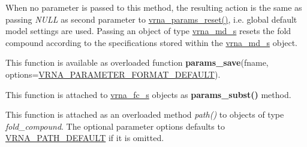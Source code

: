 \begin{DoxyRefList}
When no parameter is passed to this method, the resulting action is the same as passing {\itshape N\+U\+LL} as second parameter to \mbox{\hyperlink{group__energy__parameters_gac40dc82e48a72a97cfc58b9da08a7792}{vrna\+\_\+params\+\_\+reset()}}, i.\+e. global default model settings are used. Passing an object of type \mbox{\hyperlink{group__model__details_structvrna__md__s}{vrna\+\_\+md\+\_\+s}} resets the fold compound according to the specifications stored within the \mbox{\hyperlink{group__model__details_structvrna__md__s}{vrna\+\_\+md\+\_\+s}} object.  
\item[Global \mbox{\hyperlink{group__energy__parameters__rw_ga0de3731b3e4017c52bd678549f6c4ae5}{vrna\+\_\+params\+\_\+save}} (const char fname\mbox{[}\mbox{]}, unsigned int options)]\label{wrappers__wrappers000099}%
%
 This function is available as overloaded function {\bfseries{params\+\_\+save}}(fname, options=\mbox{\hyperlink{group__energy__parameters__rw_ga2d46720ac5bf0e56ce0dbbff459667d2}{V\+R\+N\+A\+\_\+\+P\+A\+R\+A\+M\+E\+T\+E\+R\+\_\+\+F\+O\+R\+M\+A\+T\+\_\+\+D\+E\+F\+A\+U\+LT}}).  
\item[Global \mbox{\hyperlink{group__energy__parameters_ga5d1909208f7ea3baa98b75afaa1f62ca}{vrna\+\_\+params\+\_\+subst}} (vrna\+\_\+fold\+\_\+compound\+\_\+t $\ast$vc, vrna\+\_\+param\+\_\+t $\ast$par)]\label{wrappers__wrappers000094}%
%
 This function is attached to \mbox{\hyperlink{group__fold__compound_structvrna__fc__s}{vrna\+\_\+fc\+\_\+s}} objects as {\bfseries{params\+\_\+subst()}} method.  
\item[Global \mbox{\hyperlink{group__paths__walk_gaef7afadc36933b80706de49fe36e7b94}{vrna\+\_\+path}} (vrna\+\_\+fold\+\_\+compound\+\_\+t $\ast$vc, short $\ast$pt, unsigned int steps, unsigned int options)]\label{wrappers__wrappers000133}%
%
 This function is attached as an overloaded method {\itshape path()} to objects of type {\itshape fold\+\_\+compound}. The optional parameter {\ttfamily options} defaults to \mbox{\hyperlink{group__paths__walk_gaf1bb1f8fec8d24e3b821f621b19f77b4}{V\+R\+N\+A\+\_\+\+P\+A\+T\+H\+\_\+\+D\+E\+F\+A\+U\+LT}} if it is omitted.  
\item[Global \mbox{\hyperlink{group__paths__direct_gacba096caf9a6fe134f33a5afcf2248d8}{vrna\+\_\+path\+\_\+direct}} (vrna\+\_\+fold\+\_\+compound\+\_\+t $\ast$fc, const char $\ast$s1, const char $\ast$s2, vrna\+\_\+path\+\_\+options\+\_\+t options)]\label{wrappers__wrappers000122}%
%

\end{DoxyRefList}
